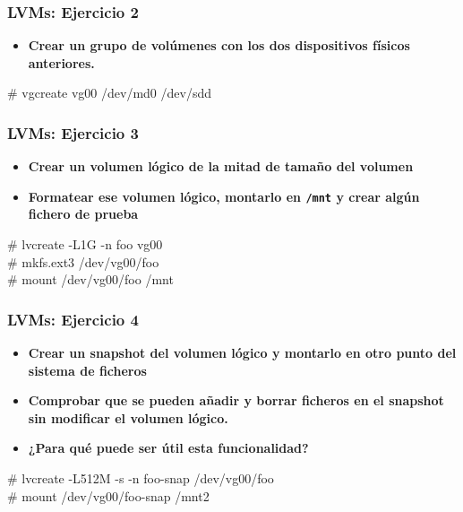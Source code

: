 \documentclass{beamer}
\begin{document}
\begin{frame}
  \frametitle{LVMs: Ejercicio 2}

\begin{itemize}
\item \textbf{Crear un grupo de volúmenes con los dos dispositivos físicos anteriores.}
\end{itemize}

\pause

  \begin{block}{}
\# vgcreate vg00 /dev/md0 /dev/sdd
  \end{block}

\end{frame}


\begin{frame}
  \frametitle{LVMs: Ejercicio 3}

\begin{itemize}
\item \textbf{Crear un volumen lógico de la mitad de tamaño del volumen}
\item \textbf{Formatear ese volumen lógico, montarlo en \texttt{/mnt} y crear algún fichero de prueba}
\end{itemize}

\pause

  \begin{block}{}
\# lvcreate -L1G -n foo vg00 \\
\# mkfs.ext3 /dev/vg00/foo \\
\# mount /dev/vg00/foo /mnt
  \end{block}

\end{frame}


\begin{frame}
  \frametitle{LVMs: Ejercicio 4}

\begin{itemize}
\item \textbf{Crear un snapshot del volumen lógico y montarlo en otro punto del sistema de ficheros}
\item \textbf{Comprobar que se pueden añadir y borrar ficheros en el snapshot sin modificar el volumen lógico.}
\item \textbf{¿Para qué puede ser útil esta funcionalidad?}
\end{itemize}

\pause

  \begin{block}{}
\# lvcreate -L512M -s -n foo-snap /dev/vg00/foo \\
\# mount /dev/vg00/foo-snap /mnt2
  \end{block}

\end{frame}
\end{document}
